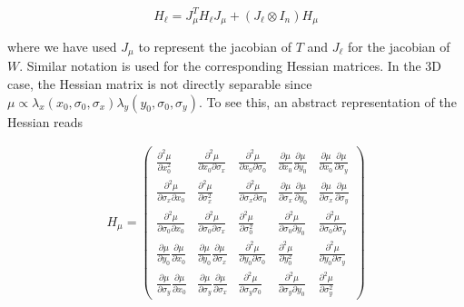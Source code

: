 \documentclass{ucetd}
\begin{document}
\begin{equation*}
H_{\ell} = J_{\mu}^{T} H_{\ell} J_{\mu} + (J_{\ell}\otimes I_{n})H_{\mu}
\end{equation*}

where we have used $J_{\mu}$ to represent the jacobian of $T$ and $J_{\ell}$ for the jacobian of $W$. Similar notation is used for the corresponding Hessian matrices. 
In the 3D case, the Hessian matrix is not directly separable since $\mu \propto \lambda_{x}(x_{0},\sigma_{0},\sigma_{x})\lambda_{y}(y_{0},\sigma_{0},\sigma_{y})$. To see this, an abstract representation of the Hessian reads 

\begin{align*}
H_{\mu} = 
\begin{pmatrix}
\frac{\partial^2 \mu}{\partial x_0^2} & \frac{\partial^2 \mu}{\partial x_0 \partial \sigma_x} & \frac{\partial^2 \mu}{\partial x_0 \partial \sigma_0} & \frac{\partial\mu}{\partial x_0}\frac{\partial \mu}{\partial y_0} & \frac{\partial \mu}{\partial x_0} \frac{\partial \mu}{\partial \sigma_y} \\
\frac{\partial^2 \mu}{\partial \sigma_x \partial x_0} & \frac{\partial^2 \mu}{\partial \sigma_x^2} & \frac{\partial^2 \mu}{\partial \sigma_x \partial \sigma_0} & \frac{\partial \mu}{\partial \sigma_x}\frac{\partial\mu}{\partial y_{0}} & \frac{\partial \mu}{\partial \sigma_x} \frac{\partial \mu}{\partial \sigma_y} \\
\frac{\partial^2 \mu}{\partial \sigma_0 \partial x_0} & \frac{\partial^2 \mu}{\partial \sigma_0 \partial \sigma_x} & \frac{\partial^2 \mu}{\partial \sigma_0^2} & \frac{\partial^2 \mu}{\partial \sigma_0 \partial y_0} & \frac{\partial^{2} \mu}{\partial \sigma_0\partial \sigma_{y}} \\
\frac{\partial \mu}{\partial y_0}\frac{\partial \mu}{\partial x_0} & \frac{\partial \mu}{\partial y_0}\frac{\partial \mu}{\partial \sigma_x} & \frac{\partial^2 \mu}{\partial y_0 \partial \sigma_0} & \frac{\partial^2 \mu}{\partial y_0^2} & \frac{\partial^{2} \mu}{\partial y_0\partial\sigma_{y}} \\
\frac{\partial \mu}{\partial \sigma_y} \frac{\partial \mu}{\partial x_0} & \frac{\partial \mu}{\partial \sigma_y} \frac{\partial \mu}{\partial \sigma_x} & \frac{\partial^{2} \mu}{\partial \sigma_y \sigma_{0}} & \frac{\partial^{2} \mu}{\partial \sigma_y\partial y_{0}} & \frac{\partial^2 \mu}{\partial \sigma_y^2}
\end{pmatrix}
\end{align*}
\end{document}
